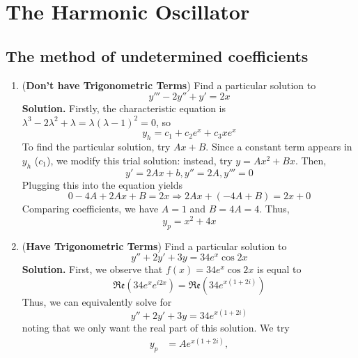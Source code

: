 \documentclass[a4paper]{article}
\begin{document}
\section{The Harmonic Oscillator}
\subsection{The method of undetermined coefficients}
\begin{enumerate}
    \item (\textbf{Don't have Trigonometric Terms}) Find a particular solution to
    \begin{equation}
        y'''-2y''+y'=2x
    \end{equation}
    \textbf{Solution.} Firstly, the characteristic equation is $\lambda^3-2\lambda^2+\lambda=\lambda(\lambda-1)^2=0$, so
    \begin{equation*}
        y_h=c_1+c_2e^x+c_3xe^x
    \end{equation*}
    To find the particular solution, try $Ax+B$. Since a constant term appears in $y_h$ ($c_1$), we modify this trial solution: instead, try $y=Ax^2+Bx$. Then,
    \begin{equation*}
        y'=2Ax+b,y''=2A,y'''=0
    \end{equation*}
    Plugging this into the equation yields
    \begin{equation*}
        0-4A+2Ax+B=2x\Rightarrow 2Ax+(-4A+B)=2x+0
    \end{equation*}
    Comparing coefficients, we have $A=1$ and $B=4A=4$. Thus,
    \begin{equation*}
        y_p=x^2+4x
    \end{equation*}
    \item (\textbf{Have Trigonometric Terms}) Find a particular solution to
    \begin{equation}
        y''+2y'+3y=34e^x\cos 2x
    \end{equation}
    \textbf{Solution.} First, we observe that $f(x)=34e^x\cos 2x$ is equal to
    \begin{equation*}
        \mathfrak{Re}(34e^xe^{i2x})=\mathfrak{Re}(34e^{x(1+2i)})
    \end{equation*}
    Thus, we can equivalently solve for
    \begin{equation*}
        y''+2y'+3y=34e^{x(1+2i)}
    \end{equation*}
    noting that we only want the real part of this solution. We try
    \begin{align*}
        y_p&=Ae^{x(1+2i)}, \\

\end{align*}
\end{enumerate}
\end{document}
